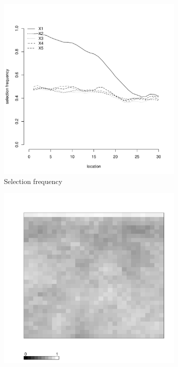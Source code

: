 \documentclass[authoryear, review, 11pt]{elsarticle}
\begin{document}
\begin{figure}
\begin{subfigure}[b]{0.45\textwidth}
		\includegraphics[width=\textwidth]{../../figures/simulation/15.10.profile_selection.pdf}
		\caption{Selection frequency}
	\end{subfigure}
	\begin{subfigure}[b]{0.45\textwidth}
	\centering
		\includegraphics[width=\textwidth]{../../figures/simulation/X1.15.10.unshrunk_bootstrap_coverage.pdf}

\end{subfigure}
\end{figure}
\end{document}
